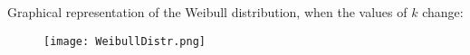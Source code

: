 \begin{frame}
  \vspace*{.5cm}
  \centering
  Graphical representation of the Weibull distribution, when the values of $ k $ change: \\
  \begin{figure}
    \texttt{[image: WeibullDistr.png]}
  \end{figure}
\end{frame}


